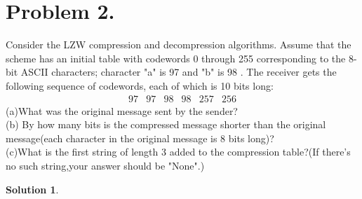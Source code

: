 \documentclass[UTF8,oneside]{article}
\newtheorem*{Solution}{Solution}
\begin{document}
\section*{Problem 2.}
Consider the LZW compression and decompression algorithms. Assume that the scheme has an initial table with codewords 0 through 255 corresponding to the 8-bit ASCII characters; character "a" is 97 and "b" is 98 . The receiver gets the following sequence of codewords, each of which is 10 bits long:
$$
\begin{array}{llllll}
97 & 97 & 98 & 98 & 257 & 256
\end{array}
$$
(a)What was the original message sent by the sender?\\
(b) By how many bits is the compressed message shorter than the original message(each character in the original message is 8 bits long)?\\
(c)What is the first string of length 3 added to the compression table?(If there's no such string,your answer should be "None".)\\
\begin{Solution}
\end{Solution}
\end{document}
